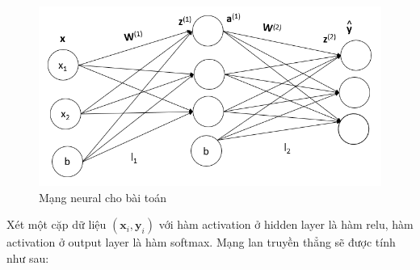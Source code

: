 \begin{figure}[H]
\begin{center}
	\includegraphics[scale=1]{chap3/image/myNeuralNetwork.png}
	\caption{Mạng neural cho bài toán }
	\label{fig:baitoan}
\end{center}
\end{figure}


Xét một cặp dữ liệu $(\textbf{x}_i,\textbf{y}_i)$ với hàm activation ở hidden layer là hàm relu, hàm activation ở output layer là hàm softmax. Mạng lan truyền thẳng sẽ được tính như sau:

